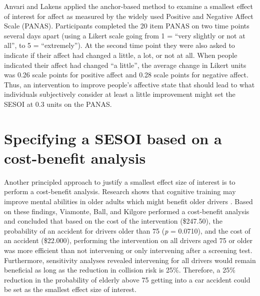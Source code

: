 \documentclass[
  oneside]{book}
\begin{document}
Anvari and Lakens \citeyearpar{anvari_using_2021} applied the anchor-based method to examine a smallest effect of interest for affect as measured by the widely used Positive and Negative Affect Scale (PANAS). Participants completed the 20 item PANAS on two time points several days apart (using a Likert scale going from 1 = ``very slightly or not at all'', to 5 = ``extremely''). At the second time point they were also asked to indicate if their affect had changed a little, a lot, or not at all. When people indicated their affect had changed ``a little'', the average change in Likert units was 0.26 scale points for positive affect and 0.28 scale points for negative affect. Thus, an intervention to improve people's affective state that should lead to what individuals subjectively consider at least a little improvement might set the SESOI at 0.3 units on the PANAS.

\hypertarget{specifying-a-sesoi-based-on-a-cost-benefit-analysis}{%
\section{Specifying a SESOI based on a cost-benefit analysis}\label{specifying-a-sesoi-based-on-a-cost-benefit-analysis}}

Another principled approach to justify a smallest effect size of interest is to perform a cost-benefit analysis. Research shows that cognitive training may improve mental abilities in older adults which might benefit older drivers \citep{ball_effects_2002}. Based on these findings, Viamonte, Ball, and Kilgore \citeyearpar{viamonte_cost-benefit_2006} performed a cost-benefit analysis and concluded that based on the cost of the intervention (\$247.50), the probability of an accident for drivers older than 75 (\emph{p} = 0.0710), and the cost of an accident (\$22.000), performing the intervention on all drivers aged 75 or older was more efficient than not intervening or only intervening after a screening test. Furthermore, sensitivity analyses revealed intervening for all drivers would remain beneficial as long as the reduction in collision risk is 25\%. Therefore, a 25\% reduction in the probability of elderly above 75 getting into a car accident could be set as the smallest effect size of interest.
\end{document}
